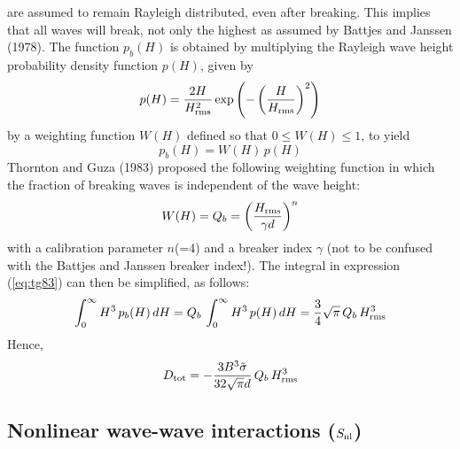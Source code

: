 \documentclass[12pt]{book}
\begin{document}
are assumed to remain Rayleigh distributed, even after breaking. This implies that all waves will break, not
only the highest as assumed by Battjes and Janssen (1978). The function $p_b(H)$ is obtained by multiplying
the Rayleigh wave height probability density function $p(H)$, given by
\begin{equation}
  p(H) = \frac{2H}{H^2_{\rm rms}}\exp \left( - \left( \frac{H}{H_{\rm rms}} \right)^2 \right)
\end{equation}
by a weighting function $W(H)$ defined so that $0 \leq W(H) \leq 1$, to yield
\begin{equation}
  p_b(H) = W(H)\,p(H)
\end{equation}
Thornton and Guza (1983) proposed the following weighting function in which the fraction of breaking waves
is independent of the wave height:
\begin{equation}
  W(H) = Q_b = \left( \frac{H_{\rm rms}}{\gamma d} \right)^n
\end{equation}
with a calibration parameter $n$(=4) and a breaker index $\gamma$ (not to be confused with the Battjes and Janssen breaker index!).
The integral in expression (\ref{eq:tg83}) can then be simplified, as follows:
\begin{equation}
  \int_{0}^{\infty} H^3 \, p_b(H)\,dH = Q_b\,\int_{0}^{\infty} H^3 \, p(H)\,dH = \frac{3}{4}\sqrt{\pi}\,Q_b\,H^3_{\rm rms}
\end{equation}
Hence,
\begin{equation}
  D_{\rm tot} = - \frac{3 B^3 \tilde{\sigma}}{32 \sqrt{\pi} d} \, Q_b\, H^3_{\rm rms}
  \label{eq:tg83_2}
\end{equation}

\subsection{Nonlinear wave-wave interactions ($S_{\rm nl}$)} \label{sec:waveint}
\end{document}
